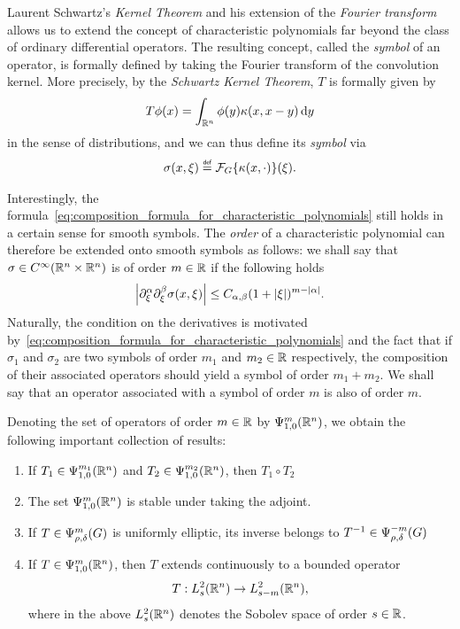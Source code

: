 Laurent Schwartz's \emph{Kernel Theorem} and his extension of the \emph{Fourier transform} allows us to extend the concept of characteristic polynomials far beyond the class of ordinary differential operators.
The resulting concept, called the \emph{symbol} of an operator,
is formally defined by taking the Fourier transform of the convolution kernel.
More precisely,
by the \emph{Schwartz Kernel Theorem},
$T$ is formally given by
\begin{align*}
    T \phi(x) = \int_{\R^n} \phi(y) \kappa(x, x - y) \dd y
\end{align*}
in the sense of distributions,
and we can thus define its \emph{symbol} via
\begin{align*}
    \sigma(x, \xi) \defeq \Fourier \{\kappa(x, \dummy)\}(\xi).
\end{align*}

Interestingly, the formula~\eqref{eq:composition_formula_for_characteristic_polynomials} still holds in a certain sense for smooth symbols.
The \emph{order} of a characteristic polynomial can therefore be extended onto smooth symbols as follows:
we shall say that $\sigma \in \SmoothFunctions {\R^n \times \R^n}$ is of order $m \in \R$
if the following holds
\begin{align*}
    \abs {\iD{\xi^\alpha, \xi^\beta} \sigma(x, \xi)} \leq C_{\alpha, \beta} (1 + \abs \xi)^{m - \abs \alpha}.
\end{align*}
Naturally, the condition on the derivatives is motivated by~\eqref{eq:composition_formula_for_characteristic_polynomials} and the fact that
if $\sigma_1$ and $\sigma_2$ are two symbols of order $m_1$ and $m_2 \in \R$ respectively,
the composition of their associated operators should yield a symbol of order $m_1 + m_2$.
We shall say that an operator associated with a symbol of order $m$ is also of order $m$.

Denoting the set of operators of order $m \in \R$ by $\OperatorClass [\R^n] m {1, 0}$,
we obtain the following important collection of results:
\begin{enumerate}
    \item
        If $T_1 \in \OperatorClass [\R^n] {m_1} {1, 0}$
        and $T_2 \in \OperatorClass [\R^n] {m_2} {1, 0}$,
        then $T_1 \circ T_2$
    \item
        The set $\OperatorClass [\R^n] m {1, 0}$ is stable under taking the adjoint.
    \item
        If $T \in \OperatorClass m {\rho, \delta}$ is uniformly elliptic,
        its inverse belongs to $T^{-1} \in \OperatorClass {-m} {\rho, \delta}$
    \item
        If $T \in \OperatorClass [\R^n] m {1, 0}$,
        then $T$ extends continuously to a bounded operator
        \begin{align*}
            T : \Sobolev [\R^n] s \to \Sobolev [\R^n] {s - m},
        \end{align*}
        where in the above $\Sobolev [\R^n] s$ denotes the Sobolev space of order $s \in \R$.
\end{enumerate}

